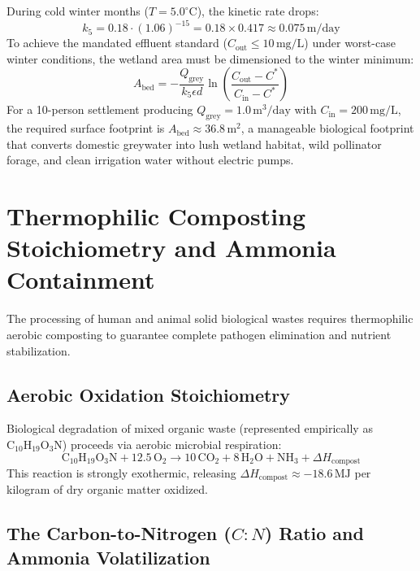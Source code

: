 During cold winter months ($T = 5.0^\circ\mathrm{C}$), the kinetic rate drops:
\begin{equation}
k_5 = 0.18 \cdot (1.06)^{-15} = 0.18 \times 0.417 \approx 0.075\,\mathrm{m/day}
\label{eq:k5_rate}
\end{equation}
To achieve the mandated effluent standard ($C_{\mathrm{out}} \le 10\,\mathrm{mg/L}$) under worst-case winter conditions, the wetland area must be dimensioned to the winter minimum:
\begin{equation}
A_{\mathrm{bed}} = -\frac{Q_{\mathrm{grey}}}{k_5 \epsilon d} \ln\left( \frac{C_{\mathrm{out}} - C^*}{C_{\mathrm{in}} - C^*} \right)
\label{eq:wetland_sizing}
\end{equation}
For a 10-person settlement producing $Q_{\mathrm{grey}} = 1.0\,\mathrm{m^3/day}$ with $C_{\mathrm{in}} = 200\,\mathrm{mg/L}$, the required surface footprint is $A_{\mathrm{bed}} \approx 36.8\,\mathrm{m^2}$, a manageable biological footprint that converts domestic greywater into lush wetland habitat, wild pollinator forage, and clean irrigation water without electric pumps.

\section{Thermophilic Composting Stoichiometry and Ammonia Containment}

The processing of human and animal solid biological wastes requires thermophilic aerobic composting to guarantee complete pathogen elimination and nutrient stabilization.

\subsection{Aerobic Oxidation Stoichiometry}

Biological degradation of mixed organic waste (represented empirically as $\mathrm{C}_{10}\mathrm{H}_{19}\mathrm{O}_3\mathrm{N}$) proceeds via aerobic microbial respiration:
\begin{equation}
\mathrm{C}_{10}\mathrm{H}_{19}\mathrm{O}_3\mathrm{N} + 12.5\,\mathrm{O}_2 \longrightarrow 10\,\mathrm{CO}_2 + 8\,\mathrm{H}_2\mathrm{O} + \mathrm{NH}_3 + \Delta H_{\mathrm{compost}}
\label{eq:compost_stoichiometry}
\end{equation}
This reaction is strongly exothermic, releasing $\Delta H_{\mathrm{compost}} \approx -18.6\,\mathrm{MJ}$ per kilogram of dry organic matter oxidized.

\subsection{The Carbon-to-Nitrogen \texorpdfstring{($C:N$)}{(C:N)} Ratio and Ammonia Volatilization}

